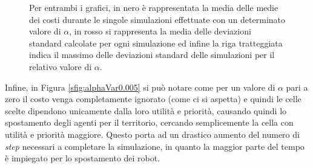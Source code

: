 \begin{figure}[t]
	\hfill
	\caption{Per entrambi i grafici, in nero è rappresentata la media delle medie dei costi durante le singole simulazioni effettuate con un determinato valore di $\alpha$, in rosso si rappresenta la media delle deviazioni standard calcolate per ogni simulazione ed infine la riga tratteggiata indica il massimo delle deviazioni standard delle simulazioni per il relativo valore di $\alpha$.}
	\label{fig:alphaVar}
\end{figure}
Infine, in Figura \ref{sfig:alphaVar0.005} si può notare come per un valore di $\alpha$ pari a zero il costo venga completamente ignorato (come ci si aspetta) e quindi le celle scelte dipendono unicamente dalla loro utilità e priorità, causando quindi lo spostamento degli agenti per il territorio, cercando semplicemente la cella con utilità e priorità maggiore. Questo porta ad un drastico aumento del numero di \textit{step} necessari a completare la simulazione, in quanto la maggior parte del tempo è impiegato per lo spostamento dei robot.

